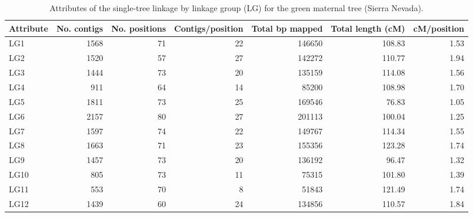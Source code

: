 \documentclass[smallextended]{svjour3}
\begin{document}
\clearpage
\begin{landscape}

\begin{table}[ht]
\caption{Attributes of the single-tree linkage by linkage group (LG) for the green maternal tree (Sierra Nevada).} 
\begin{tabular}{lrrrrrr}
  \toprule
  Attribute & No. contigs & No. positions & Contigs/position & Total bp mapped & Total length (cM) & cM/position \\
  \midrule
  LG1 & 1568 & 71 & 22 & \num{146650} & 108.83 & 1.53 \\
  LG2 & 1520 & 57 & 27 & \num{142272} & 110.77 & 1.94 \\
  LG3 & 1444 & 73 & 20 & \num{135159} & 114.08 & 1.56 \\
  LG4 & 911 & 64 & 14 & \num{85200} & 108.98 & 1.70 \\
  LG5 & 1811 & 73 & 25 & \num{169546} & 76.83 & 1.05 \\
  LG6 & 2157 & 80 & 27 & \num{201113} & 100.04 & 1.25 \\
  LG7 & 1597 & 74 & 22 & \num{149767} & 114.34 & 1.55 \\
  LG8 & 1663 & 71 & 23 & \num{155356} & 123.28 & 1.74 \\
  LG9 & 1457 & 73 & 20 & \num{136192} & 96.47 & 1.32 \\
  LG10 & 805 & 73 & 11 & \num{75315} & 101.80 & 1.39 \\
  LG11 & 553 & 70 & 8 & \num{51843} & 121.49 & 1.74 \\
  LG12 & 1439 & 60 & 24 & \num{134856} & 110.57 & 1.84 \\
  \bottomrule
\end{tabular}
\label{t:label}
\end{table}
\end{landscape}
\end{document}

